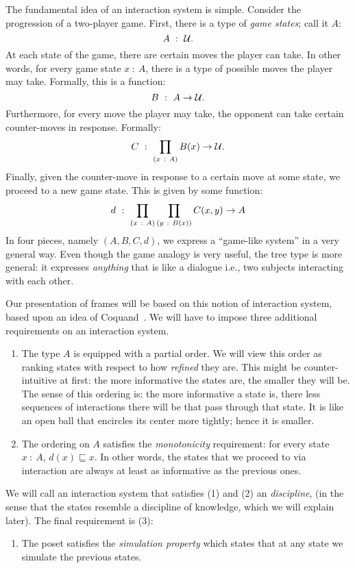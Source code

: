 The fundamental idea of an interaction system is simple. Consider the progression of a
two-player game. First, there is a type of \emph{game states}; call it $A$:
\begin{equation*}
  A~:~\mathcal{U}.
\end{equation*}
At each state of the game, there are certain moves the player can take. In other words,
for every game state $x~:~A$, there is a type of possible moves the player may take.
Formally, this is a function:
\begin{equation*}
  B~:~A \rightarrow \mathcal{U}.
\end{equation*}
Furthermore, for every move the player may take, the opponent can take certain
counter-moves in response. Formally:
\begin{equation*}
  C~:~\prod_{(x~:~A)} B(x) \rightarrow \mathcal{U}.
\end{equation*}
Finally, given the counter-move in response to a certain move at some state, we proceed to
a new game state. This is given by some function:
\begin{equation*}
  d~:~\prod_{(x~:~A)} \prod_{(y~:~B(x))} C(x, y) \rightarrow A
\end{equation*}
In four pieces, namely $(A, B, C, d)$, we express a ``game-like system'' in a very general
way. Even though the game analogy is very useful, the tree type is more general: it
expresses \emph{anything} that is like a dialogue i.e., two subjects interacting with each
other.

Our presentation of frames will be based on this notion of interaction system, based upon
an idea of Coquand~\cite{coq-posets}. We will have to impose three additional requirements
on an interaction system.
\begin{enumerate}
  \item The type $A$ is equipped with a partial order. We will view this order as ranking
    states with respect to how \emph{refined} they are. This might be counter-intuitive at
    first: the more informative the states are, the smaller they will be. The sense of
    this ordering is: the more informative a state is, there less sequences of
    interactions there will be that pass through that state. It is like an open ball that
    encircles its center more tightly; hence it is smaller.
  \item The ordering on $A$ satisfies the \emph{monotonicity} requirement: for every state
    $x~:~A$, $d(x) \sqsubseteq x$. In other words, the states that we proceed to via interaction are
    always at least as informative as the previous ones.
\end{enumerate}
We will call an interaction system that satisfies (1) and (2) an \emph{discipline}, (in the
sense that the states resemble a discipline of knowledge, which we will explain later).
The final requirement is (3):
\begin{enumerate}
  \item The poset satisfies the \emph{simulation property} which states that at any state
    we simulate the previous states.
\end{enumerate}

